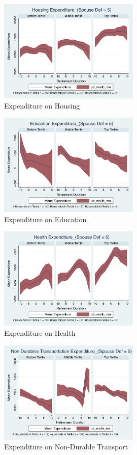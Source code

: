 \documentclass[11pt,onecolumn]{article}
\begin{document}
\clearpage

\begin{figure}[h]
	\caption{Expenditure on Housing}
	\centering
	\includegraphics[width=0.6\textwidth]{../ConsumptionPostRetirement_by_SpouseDef_Cats/Smoothed/5/spouse_def_total_housing_real.pdf}
\end{figure}


\begin{figure}[h]
	\caption{Expenditure on Education}
	\centering
	\includegraphics[width=0.6\textwidth]{../ConsumptionPostRetirement_by_SpouseDef_Cats/Smoothed/5/spouse_def_total_education_real.pdf}
\end{figure}
\clearpage

\begin{figure}[h]
	\caption{Expenditure on Health}
	\centering
	\includegraphics[width=0.6\textwidth]{../ConsumptionPostRetirement_by_SpouseDef_Cats/Smoothed/5/spouse_def_total_healthexpense_real.pdf}
\end{figure}


\begin{figure}[h]
	\caption{Expenditure on Non-Durable Transport}
	\centering
	\includegraphics[width=0.6\textwidth]{../ConsumptionPostRetirement_by_SpouseDef_Cats/Smoothed/5/spouse_def_total_transport_real.pdf}
\end{figure}
\clearpage
\end{document}
